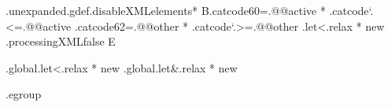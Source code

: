 .unexpanded.gdef.disableXMLelements* 
  B.catcode60=.@@active * .catcode`.<=.@@active 
   .catcode62=.@@other  * .catcode`.>=.@@other
   .let<.relax * new 
   .processingXMLfalse
  E

.global.let<.relax * new 
.global.let&.relax * new 

.egroup

\def\disableXML{\setnormalcatcodes\processingXMLfalse}





